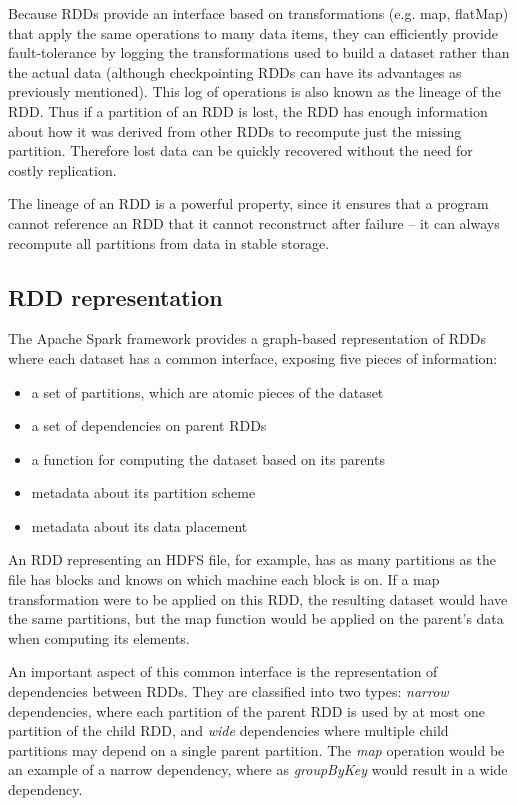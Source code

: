 \documentclass{l4proj}
\begin{document}
Because RDDs provide an interface based on transformations (e.g. map, flatMap) that apply the same operations to many data items, they can efficiently provide fault-tolerance by logging the transformations used to build a dataset rather than the actual data (although checkpointing RDDs can have its advantages as previously mentioned). This log of operations is also known as the lineage of the RDD. Thus if a partition of an RDD is lost, the RDD has enough information about how it was derived from other RDDs to recompute just the missing partition\cite{RDD}. Therefore lost data can be quickly recovered without the need for costly replication.

The lineage of an RDD is a powerful property, since it ensures that a program cannot reference an RDD that it cannot reconstruct after failure -- it can always recompute all partitions from data in stable storage.

\subsection{RDD representation}

The Apache Spark framework provides a graph-based representation of RDDs where each dataset has a common interface, exposing five pieces of information:

\begin{itemize}
\renewcommand{\labelitemi}{\scriptsize$\blacksquare$}
\item a set of partitions, which are atomic pieces of the dataset
\item a set of dependencies on parent RDDs
\item a function for computing the dataset based on its parents
\item metadata about its partition scheme
\item metadata about its data placement
\end{itemize}

An RDD representing an HDFS file, for example, has as many partitions as the file has blocks and knows on which machine each block is on. If a map transformation were to be applied on this RDD, the resulting dataset would have the same partitions, but the map function would be applied on the parent's data when computing its elements.

An important aspect of this common interface is the representation of dependencies between RDDs. They are classified into two types: \textit{narrow} dependencies, where each partition of the parent RDD is used by at most one partition of the child RDD, and \textit{wide} dependencies where multiple child partitions may depend on a single parent partition\cite{RDD}. The \textit{map} operation would be an example of a narrow dependency, where as \textit{groupByKey} would result in a wide dependency.
\end{document}

